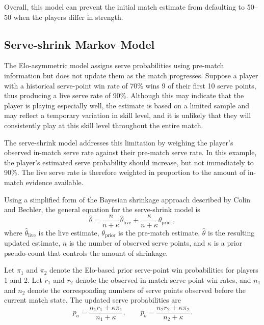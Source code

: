\documentclass[10pt,twocolumn]{article}
\begin{document}
Overall, this model can prevent the initial match estimate from defaulting to 50--50 when the players differ in strength.

\subsection{Serve-shrink Markov Model}

The Elo-asymmetric model assigns serve probabilities using pre-match information but does not update them as the match progresses. Suppose a player with a historical serve-point win rate of 70\% wins 9 of their first 10 serve points, thus producing a live serve rate of 90\%. Although this may indicate that the player is playing especially well, the estimate is based on a limited sample and may reflect a temporary variation in skill level, and it is unlikely that they will consistently play at this skill level throughout the entire match.

The serve-shrink model addresses this limitation by weighing the player's observed in-match serve rate against their pre-match serve rate. In this example, the player's estimated serve probability should increase, but not immediately to 90\%. The live serve rate is therefore weighted in proportion to the amount of in-match evidence available.

Using a simplified form of the Bayesian shrinkage approach described by Colin and Bechler,\cite{colin2015} the general equation for the serve-shrink model is
\begin{equation}
\hat{\theta}
=\frac{n}{n+\kappa}\hat{\theta}_{\mathrm{live}}
+\frac{\kappa}{n+\kappa}\theta_{\mathrm{prior}},
\end{equation}
where $\hat{\theta}_{\mathrm{live}}$ is the live estimate, $\theta_{\mathrm{prior}}$ is the pre-match estimate, $\hat{\theta}$ is the resulting updated estimate, $n$ is the number of observed serve points, and $\kappa$ is a prior pseudo-count that controls the amount of shrinkage.

Let $\pi_1$ and $\pi_2$ denote the Elo-based prior serve-point win probabilities for players 1 and 2. Let $r_1$ and $r_2$ denote the observed in-match serve-point win rates, and $n_1$ and $n_2$ denote the corresponding numbers of serve points observed before the current match state. The updated serve probabilities are
\begin{equation}
p_a=\frac{n_1r_1+\kappa\pi_1}{n_1+\kappa},
\qquad
p_b=\frac{n_2r_2+\kappa\pi_2}{n_2+\kappa}.
\end{equation}
\end{document}
